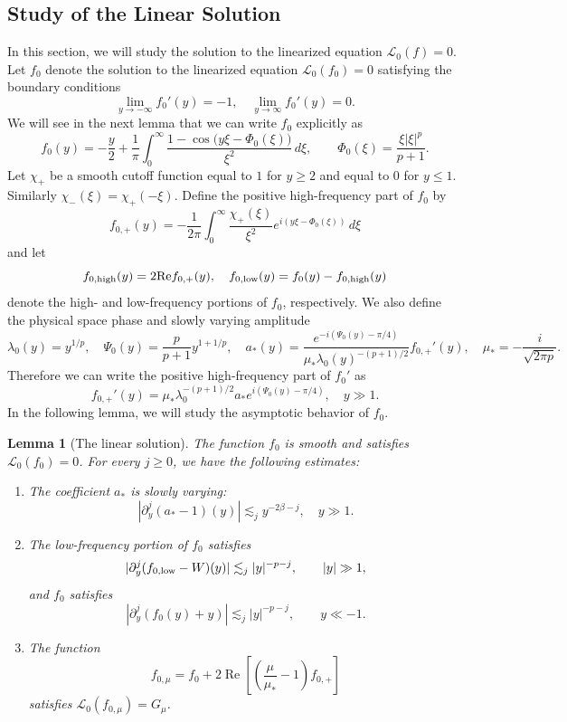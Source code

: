 \documentclass[11pt]{amsart}
\newtheorem{lemma}[theorem]{Lemma}
\theoremstyle{definition}
\theoremstyle{remark}
\numberwithin{equation}{section}
\newcommand{\mc}[1]{\mathcal{#1}}
\begin{document}
\subsection{Study of the Linear Solution}\label{sec:approx_linear_solution}

In this section, we will study the solution to the linearized equation $\mc{L}_0(f) = 0$. Let $f_{0}$ denote the solution to the linearized equation $\mc{L}_0(f_{0}) = 0$ satisfying the boundary conditions
\[\lim_{y \to -\infty} f_{0}'(y) = -1, \quad \lim_{y \to \infty} f_{0}'(y) = 0.\]
We will see in the next lemma that we can write $f_{0}$ explicitly as
\begin{equation}\label{eqn:fixed_point_linear_solution}
f_{0}(y) = -\frac{y}{2} + \frac{1}{\pi}\int_0^\infty
\frac{1-\cos\bigl(y\xi-\Phi_0(\xi)\bigr)}{\xi^2}\,d\xi,
\qquad \Phi_0(\xi)=\frac{\xi|\xi|^p}{p+1}.
\end{equation}
Let $\chi_+$ be a smooth cutoff function equal to $1$ for $y \geq 2$ and equal to $0$ for $y \leq 1$. Similarly $\chi_-(\xi) = \chi_+(-\xi)$. Define the positive high-frequency part of $f_{0}$ by
\[f_{0, +}(y) = -\frac{1}{2\pi}\int_{0}^{\infty}\frac{\chi_+(\xi)}{\xi^2}e^{i(y\xi - \Phi_0(\xi))} \, d\xi\]
and let 
\[f_{0, \textup{high}}(y) = 2 \text{Re} f_{0, +}(y) , \quad f_{0, \textup{low}}(y) = f_{0}(y) - f_{0, \textup{high}}(y)\]
denote the high- and low-frequency portions of $f_{0}$, respectively. We also define the physical space phase and slowly varying amplitude 
\[\lambda_0(y)=y^{1/p},\quad
 \Psi_0(y)=\frac{p}{p+1}y^{1+1/p},\quad
 a_*(y)=\frac{e^{-i(\Psi_0(y)-\pi/4)}}
    {\mu_*\lambda_0(y)^{-(p+1)/2}}f_{0,+}'(y), \quad \mu_* = - \frac{i}{\sqrt{2\pi p}}.\]
Therefore we can write the positive high-frequency part of $f_{0}'$ as
\[f_{0, +}'(y) = \mu_* \lambda_0^{-(p+1)/2} a_* e^{i(\Psi_0(y) - \pi/4)}, \quad y \gg 1.\]
In the following lemma, we will study the asymptotic behavior of $f_{0}$. 
\begin{lemma}[The linear solution]\label{lem:approx_linear_seed}
The function $f_0$ is smooth and satisfies
$\mc L_0(f_0)=0$. For every $j \geq 0$, we have the following estimates:
\begin{enumerate}
    \item The coefficient $a_*$ is slowly varying:
    \[|\partial_y^j(a_*-1)(y)|\lesssim_j y^{-2\beta-j}, \quad y \gg 1.\]
    \item The low-frequency portion of  $f_0$ satisfies
    \[|\partial_y^j(f_{0,\textup{low}}-W)(y)|\lesssim_j |y|^{-p-j},\qquad |y|\gg1,\]
    and $f_0$ satisfies
    \[|\partial_y^j(f_0(y)+y)|\lesssim_j |y|^{-p-j},\qquad y\ll-1.\]
    \item The function
        \begin{equation}\label{eqn:approx_amplitude_seed}
        f_{0,\mu}=f_0
        +2\operatorname{Re}\left[\left(\frac\mu{\mu_*}-1\right)f_{0, +}\right]
        \end{equation}
        satisfies $\mc L_0(f_{0,\mu}) = G_\mu$.
\end{enumerate}
\end{lemma}
\end{document}

